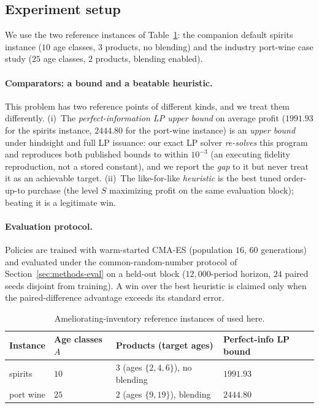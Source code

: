\documentclass[11pt]{article}
\begin{document}
\subsection{Experiment setup}
\label{sec:amelior-setup}

We use the two reference instances of Table~\ref{tab:amelior-params}: the companion default
spirits instance ($10$ age classes, $3$ products, no blending) and the industry port-wine
case study ($25$ age classes, $2$ products, blending enabled).

\paragraph{Comparators: a bound and a beatable heuristic.}
This problem has two reference points of different kinds, and we treat them differently. (i)~The
\emph{perfect-information LP upper bound} on average profit ($1991.93$ for the spirits instance,
$2444.80$ for the port-wine instance) is an \emph{upper bound} under hindsight and full LP issuance: our
exact LP solver \emph{re-solves} this program and reproduces both published bounds to within $10^{-3}$ (an
executing fidelity reproduction, not a stored constant), and we report the \emph{gap} to it but never treat it
as an achievable target. (ii)~The like-for-like \emph{heuristic} is the best tuned order-up-to
purchase (the level $S$ maximizing profit on the same evaluation block); beating it is a legitimate
win.

\paragraph{Evaluation protocol.}
Policies are trained with warm-started CMA-ES (population $16$, $60$ generations) and
evaluated under the common-random-number protocol of Section~\ref{sec:methods-eval} on a held-out
block ($12{,}000$-period horizon, $24$ paired seeds disjoint from training). A win over the best heuristic is
claimed only when the paired-difference advantage exceeds its standard error.

\begin{table}[!htbp]
\centering
\small
\caption{Ameliorating-inventory reference instances of \citet{pahrGrunow2025} used here.}
\label{tab:amelior-params}
\begin{tabular}{llll}
\toprule
Instance & Age classes $A$ & Products (target ages) & Perfect-info LP bound \\
\midrule
spirits  & $10$ & $3$ (ages $\{2,4,6\}$), no blending & $1991.93$ \\
port wine    & $25$ & $2$ (ages $\{9,19\}$), blending     & $2444.80$ \\
\bottomrule
\end{tabular}
\end{table}
\FloatBarrier
\end{document}
